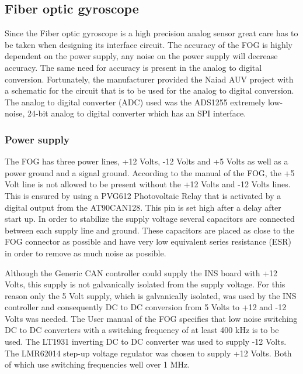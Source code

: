 \subsection{Fiber optic gyroscope}
Since the Fiber optic gyroscope is a high precision analog sensor great care has to be taken when designing its interface circuit. \newline
The accuracy of the FOG is highly dependent on the power supply, any noise on the power supply will decrease accuracy. The same need for accuracy is present in the analog to digital conversion. Fortunately, the manufacturer provided the Naiad AUV project with a schematic for the circuit that is to be used for the analog to digital conversion. The analog to digital converter (ADC) used was the ADS1255 extremely low-noise, 24-bit analog to digital converter which has an SPI interface.

\subsubsection{Power supply}
The FOG has three power lines, +12 Volts, -12 Volts and +5 Volts as well as a power ground and a signal ground. \newline
According to the manual of the FOG, the +5 Volt line is not allowed to be present without the +12 Volts and -12 Volts lines. This is ensured by using a PVG612 Photovoltaic Relay that is activated by a digital output from the AT90CAN128. This pin is set high after a delay after start up. \newline
In order to stabilize the supply voltage several capacitors are connected between each supply line and ground. These capacitors are placed as close to the FOG connector as possible and have very low equivalent series resistance (ESR) in order to remove as much noise as possible. 

Although the Generic CAN controller could supply the INS board with +12 Volts, this supply is not galvanically isolated from the supply voltage. For this reason only the 5 Volt supply, which is galvanically isolated, was used by the INS controller and consequently DC to DC conversion from 5 Volts to +12 and -12 Volts was needed. \newline
The User manual of the FOG specifies that low noise switching DC to DC converters with a switching frequency of at least 400 kHz is to be used. The LT1931 inverting DC to DC converter was used to supply -12 Volts. The LMR62014 step-up voltage regulator was chosen to supply +12 Volts. Both of which use switching frequencies well over 1 MHz.


